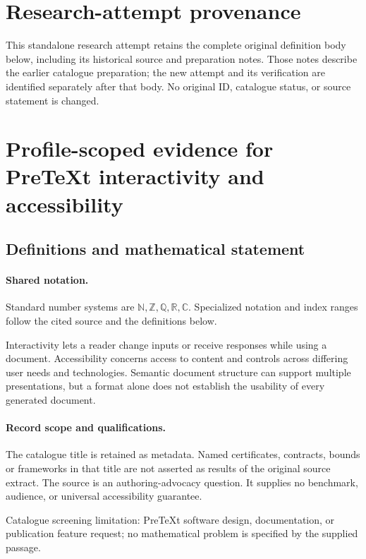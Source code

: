\documentclass[11pt]{article}
\begin{document}
\section*{Research-attempt provenance}
This standalone research attempt retains the complete original definition body below,
including its historical source and preparation notes. Those notes describe the
earlier catalogue preparation; the new attempt and its verification are identified
separately after that body. No original ID, catalogue status, or source statement is changed.

\section{Profile-scoped evidence for PreTeXt interactivity and accessibility}\label{statement}

\subsection{Definitions and mathematical statement}

\paragraph{Shared notation.}Standard number systems are $\mathbb N,\mathbb Z,\mathbb Q,\mathbb R,\mathbb C$. Specialized notation and index ranges follow the cited source and the definitions below.


Interactivity lets a reader change inputs or receive responses while using a document. Accessibility concerns access to content and controls across differing user needs and technologies. Semantic document structure can support multiple presentations, but a format alone does not establish the usability of every generated document.
\paragraph{Record scope and qualifications.}
The catalogue title is retained as metadata. Named certificates, contracts, bounds or frameworks in that title are not asserted as results of the original source extract.
The source is an authoring-advocacy question. It supplies no benchmark, audience, or universal accessibility guarantee.

Catalogue screening limitation: PreTeXt software design, documentation, or publication feature request; no mathematical problem is specified by the supplied passage.
\end{document}
